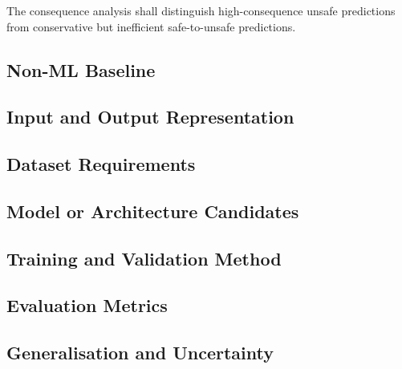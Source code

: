 The consequence analysis shall distinguish high-consequence unsafe predictions
from conservative but inefficient safe-to-unsafe predictions.

\subsection{Non-ML Baseline}
\label{sec:res-ml-rol-non-ml-baseline}


\subsection{Input and Output Representation}
\label{sec:res-ml-rol-input-output-representation}


\subsection{Dataset Requirements}
\label{sec:res-ml-rol-dataset-requirements}


\subsection{Model or Architecture Candidates}
\label{sec:res-ml-rol-model-architecture-candidates}


\subsection{Training and Validation Method}
\label{sec:res-ml-rol-training-validation-method}


\subsection{Evaluation Metrics}
\label{sec:res-ml-rol-evaluation-metrics}


\subsection{Generalisation and Uncertainty}
\label{sec:res-ml-rol-generalisation-uncertainty}

